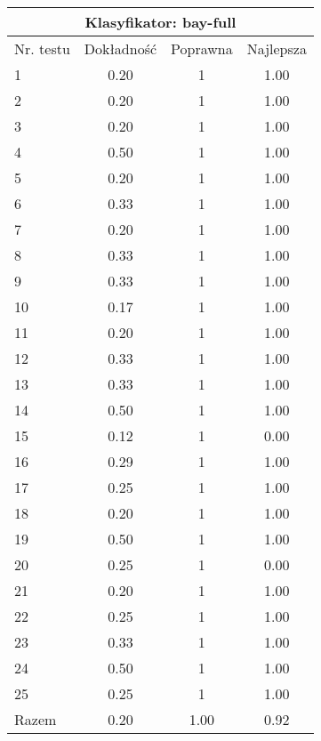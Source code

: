\begin{tabular}{|l|c|c|c|}
\hline
\multicolumn{4}{|c|}{Klasyfikator: bay-full}\\
\hline
Nr. testu & Dokładność & Poprawna & Najlepsza\\
\hline
1 & 0.20 & 1 & 1.00 \\
2 & 0.20 & 1 & 1.00 \\
3 & 0.20 & 1 & 1.00 \\
4 & 0.50 & 1 & 1.00 \\
5 & 0.20 & 1 & 1.00 \\
6 & 0.33 & 1 & 1.00 \\
7 & 0.20 & 1 & 1.00 \\
8 & 0.33 & 1 & 1.00 \\
9 & 0.33 & 1 & 1.00 \\
10 & 0.17 & 1 & 1.00 \\
11 & 0.20 & 1 & 1.00 \\
12 & 0.33 & 1 & 1.00 \\
13 & 0.33 & 1 & 1.00 \\
14 & 0.50 & 1 & 1.00 \\
15 & 0.12 & 1 & 0.00 \\
16 & 0.29 & 1 & 1.00 \\
17 & 0.25 & 1 & 1.00 \\
18 & 0.20 & 1 & 1.00 \\
19 & 0.50 & 1 & 1.00 \\
20 & 0.25 & 1 & 0.00 \\
21 & 0.20 & 1 & 1.00 \\
22 & 0.25 & 1 & 1.00 \\
23 & 0.33 & 1 & 1.00 \\
24 & 0.50 & 1 & 1.00 \\
25 & 0.25 & 1 & 1.00 \\
\hline
Razem & 0.20 & 1.00 & 0.92 \\
\hline
\end{tabular}
